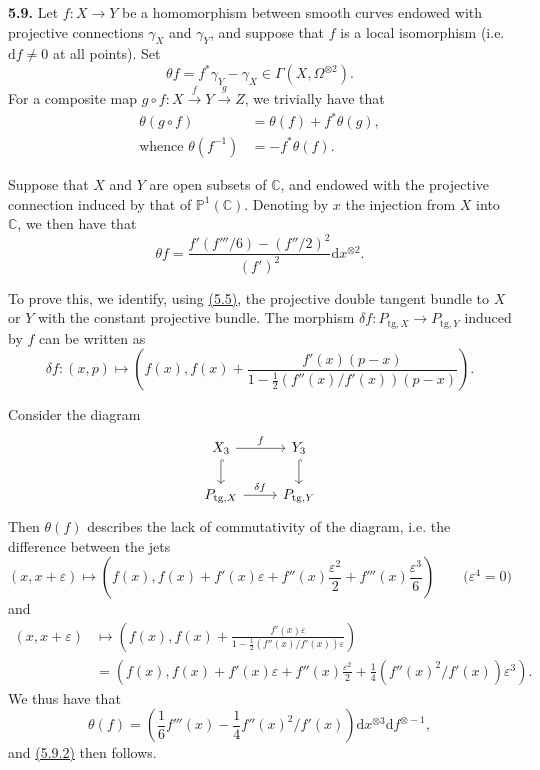 \documentclass{report}
\newenvironment{rmenv}[1]
  {\phantomsection\par\medskip\noindent\textbf{#1.}\rmfamily}
  {\medskip}
\newcommand{\PP}{\mathbb{P}}
\newcommand{\CC}{\mathbb{C}}
\newcommand{\dd}{\mathrm{d}}
\newcommand{\tg}{\mathrm{tg}}
\newcommand{\oldpage}[1]{\marginpar{\footnotesize$\Big\vert$ \textit{p.~#1}}}
\begin{document}
\begin{rmenv}{5.9}
\label{I.5.9}
  Let $f\colon X\to Y$ be a homomorphism between smooth curves endowed with projective connections $\gamma_X$ and $\gamma_Y$, and suppose that $f$ is a local isomorphism (i.e. $\dd f\neq0$ at all points).
  Set
  \[
    \theta f = f^*\gamma_Y - \gamma_X \in \Gamma(X,\Omega^{\otimes2}).
  \]
  For a composite map $g\circ f\colon X\xrightarrow{f}Y\xrightarrow{g}Z$, we trivially have that
  \[
  \label{I.5.9.1}
    \begin{aligned}
      \theta(g\circ f) &= \theta(f) + f^*\theta(g),
    \\\mbox{whence }\theta(f^{-1}) &= -f^*\theta(f).
    \end{aligned}
  \tag{5.9.1}
  \]

  Suppose that $X$ and $Y$ are open subsets of $\CC$, and endowed with the projective connection induced by that of $\PP^1(\CC)$.
  Denoting by $x$ the injection from $X$ into $\CC$, we then have that
\oldpage{33}
  \[
  \label{I.5.9.2}
    \theta f = \frac{f'(f'''/6) - (f''/2)^2}{(f')^2} \dd x^{\otimes2}.
  \tag{5.9.2}
  \]

  To prove this, we identify, using \hyperref[I.5.5]{(5.5)}, the projective double tangent bundle to $X$ or $Y$ with the constant projective bundle.
  The morphism $\delta f\colon P_{\tg,X}\to P_{\tg,Y}$ induced by $f$ can be written as
  \[
    \delta f\colon (x,p) \mapsto
    \left(
      f(x),
      f(x) + \frac{f'(x)(p-x)}{1-\frac12(f''(x)/f'(x))(p-x)}
    \right).
  \]

  Consider the diagram
  \[
    \begin{tikzcd}
      X_3 \rar["f"] \dar[hook]
      & Y_3 \dar[hook]
    \\P_{\tg,X} \rar["\delta f"]
      & P_{\tg,Y}
    \end{tikzcd}
  \]
  Then $\theta(f)$ describes the lack of commutativity of the diagram, i.e. the difference between the jets
  \[
    (x,x+\varepsilon)
    \mapsto
    \left(
      f(x),
      f(x) + f'(x)\varepsilon + f''(x)\frac{\varepsilon^2}{2} + f'''(x)\frac{\varepsilon^3}{6}
    \right)
    \qquad\mbox{($\varepsilon^4=0$)}
  \]
  and
  \[
    \begin{aligned}
      (x,x+\varepsilon)
      &\mapsto
      \left(
        f(x),
        f(x) + \frac{f'(x)\varepsilon}{1-\frac12(f''(x)/f'(x))\varepsilon}
      \right)
    \\&= \left(
        f(x),
        f(x) + f'(x)\varepsilon + f''(x)\frac{\varepsilon^2}{2} + \frac14(f''(x)^2/f'(x))\varepsilon^3
      \right).
    \end{aligned}
  \]
  We thus have that
  \[
    \theta(f) =
    \left(
      \frac16f'''(x) - \frac14f''(x)^2/f'(x)
    \right) \dd x^{\otimes3} \dd f^{\otimes-1},
  \]
  and \hyperref[I.5.9.2]{(5.9.2)} then follows.


\end{rmenv}
\end{document}
